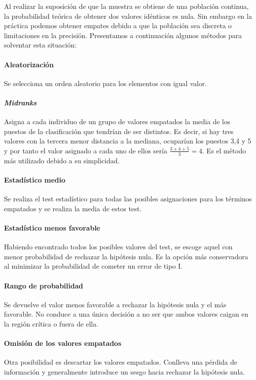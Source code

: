 	Al realizar la suposición de que la muestra se obtiene de una población continua, la probabilidad teórica de obtener dos valores idénticos es nula. Sin embargo en la práctica podemos obtener empates debido a que la población sea discreta o limitaciones en la precisión. Presentamos a continuación algunos métodos para solventar esta situación:
	
\paragraph{Aleatorización} Se selecciona un orden aleatorio para los elementos con igual valor.

\paragraph{\textit{Midranks}} Asigna a cada individuo de un grupo de valores empatados la media de los puestos de la clasificación que tendrían de ser distintos. Es decir, si hay tres valores con la tercera menor distancia a la mediana, ocuparían los puestos 3,4 y 5 y por tanto el valor asignado a cada uno de ellos sería $\frac{3+4+5}{3}=4$. Es el método más utilizado debido a su simplicidad. 

\paragraph{Estadístico medio} Se realiza el test estadístico para todas las posibles asignaciones para los términos empatados y se realiza la media de estos test.

\paragraph{Estadístico menos favorable} Habiendo encontrado todos los posibles valores del test, se escoge aquel con menor probabilidad de rechazar la hipótesis nula. Es la opción más conservadora al minimizar la probabilidad de cometer un error de tipo I.

\paragraph{Rango de probabilidad} Se devuelve el valor menos favorable a rechazar la hipótesis nula y el más favorable. No conduce a una única decisión a no ser que ambos valores caigan en la región crítica o fuera de ella.

\paragraph{Omisión de los valores empatados} Otra posibilidad es descartar los valores empatados. Conlleva una pérdida de información y generalmente introduce un sesgo hacia rechazar la hipótesis nula.
	
